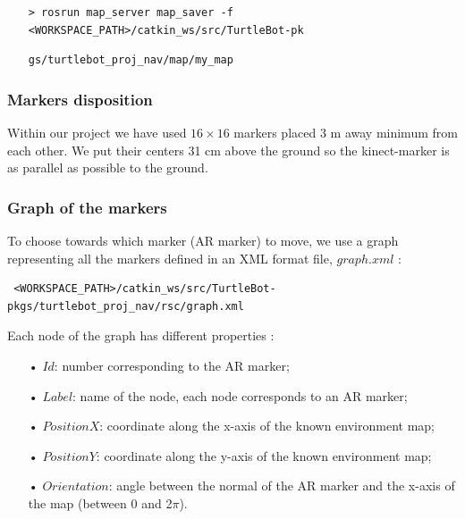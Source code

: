 \documentclass[10pt,a4paper]{article}
\begin{document}
\begin{itemize}
\item[]  \begin{verbatim}> rosrun map_server map_saver -f <WORKSPACE_PATH>/catkin_ws/src/TurtleBot-pk\end{verbatim}
\item[]  \begin{verbatim}gs/turtlebot_proj_nav/map/my_map\end{verbatim}
\end{itemize}

\subsubsection{Markers disposition}
 
Within our project we have used  $16 \times 16$ markers placed 3 m away minimum from each other. We put their centers 31 cm above the ground so the kinect-marker is as parallel as possible to the ground.\\

\subsubsection{Graph of the markers}
\label{sec:graphOfTheMarkers}

To choose towards which marker (AR marker) to move, we use a graph representing all the markers defined in an XML format file, $graph.xml$ :

\begin{verbatim} <WORKSPACE_PATH>/catkin_ws/src/TurtleBot-pkgs/turtlebot_proj_nav/rsc/graph.xml\end{verbatim}

Each node of the graph has different properties :

\begin{itemize}
\item[•] $Id$: number corresponding to the AR marker;
\item[•] $Label$: name of the node, each node corresponds to an AR marker;
\item[•] $PositionX$: coordinate along the x-axis of the known environment map;
\item[•] $PositionY$: coordinate along the y-axis of the known environment map;
\item[•] $Orientation$: angle between the normal of the AR marker and the x-axis of the map (between 0 and 2$\pi$).
\end{itemize}
\end{document}
